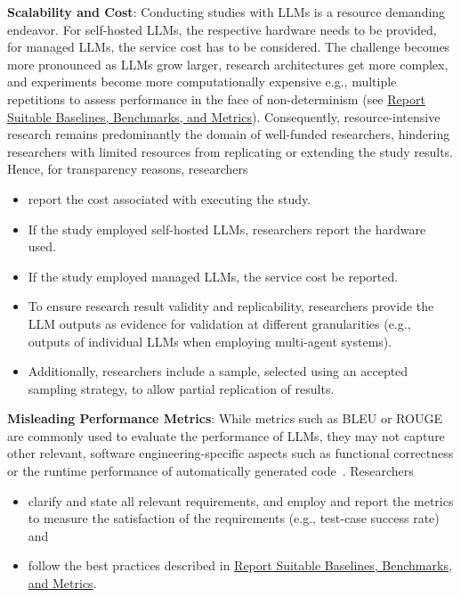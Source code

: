 \textbf{Scalability and Cost}:
Conducting studies with LLMs is a resource demanding endeavor. For self-hosted LLMs, the respective hardware needs to be provided, for managed LLMs, the service cost has to be considered. The challenge becomes more pronounced as LLMs grow larger, research architectures get more complex, and experiments become more computationally expensive e.g., multiple repetitions to assess performance in the face of non-determinism (see \href{/guidelines/report-baselines-benchmarks-and-metrics}{Report Suitable Baselines, Benchmarks, and Metrics}).
Consequently, resource-intensive research remains predominantly the domain of well-funded researchers, hindering researchers with limited resources from replicating or extending the study results. Hence, for transparency reasons, researchers
\begin{itemize}
  \item \should report the cost associated with executing the study. 
  \item If the study employed self-hosted LLMs, researchers \should report the hardware used. 
  \item If the study employed managed LLMs, the service cost \should be reported.
  \item To ensure research result validity and replicability, researchers \must provide the LLM outputs as evidence for validation at different granularities (e.g., outputs of individual LLMs when employing multi-agent systems).
  \item Additionally, researchers \should include a sample, selected using an accepted sampling strategy, to allow partial replication of results.
\end{itemize}

\textbf{Misleading Performance Metrics}:
While metrics such as BLEU or ROUGE are commonly used to evaluate the performance of LLMs, they may not capture other relevant, software engineering-specific aspects such as functional correctness or the runtime performance of automatically generated code~\cite{DBLP:conf/nips/LiuXW023}. Researchers
\begin{itemize}
  \item \should clarify and state all relevant requirements, and employ and report the metrics to measure the satisfaction of the requirements (e.g., test-case success rate) and 
  \item \should follow the best practices described in \href{/guidelines/report-baselines-benchmarks-and-metrics}{Report Suitable Baselines, Benchmarks, and Metrics}.
\end{itemize}

